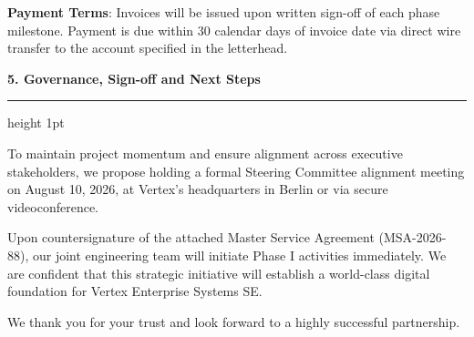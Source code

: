 \documentclass[english,11pt]{g-brief}
\newcommand{\lettersection}[1]{%
  \vspace{3.5mm}%
  {\color{NavyPrimary}\Large\bfseries #1}\par%
  \vspace{1mm}%
  {\color{SlateSecondary}\hrule height 1pt}\par%
  \vspace{2.5mm}%
}
\begin{document}
\begin{g-brief}
\vspace{2.5mm}
\begin{tcolorbox}[
    colback=WarmGray,
    colframe=BorderGray,
    boxrule=0.8pt,
    arc=1.5mm,
    top=2mm,
    bottom=2mm
]
\textcolor{DarkText}{\small\textbf{Payment Terms}: Invoices will be issued upon written sign-off of each phase milestone. Payment is due within 30 calendar days of invoice date via direct wire transfer to the account specified in the letterhead.}
\end{tcolorbox}

\lettersection{5. Governance, Sign-off and Next Steps}

To maintain project momentum and ensure alignment across executive stakeholders, we propose holding a formal Steering Committee alignment meeting on August 10, 2026, at Vertex's headquarters in Berlin or via secure videoconference.

Upon countersignature of the attached Master Service Agreement (MSA-2026-88), our joint engineering team will initiate Phase I activities immediately. We are confident that this strategic initiative will establish a world-class digital foundation for Vertex Enterprise Systems SE.

We thank you for your trust and look forward to a highly successful partnership.

\end{g-brief}
\end{document}
